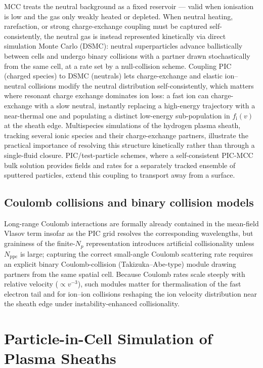 MCC treats the neutral background as a fixed reservoir --- valid when ionisation is low and the gas only weakly heated or depleted. When neutral heating, rarefaction, or strong charge-exchange coupling must be captured self-consistently, the neutral gas is instead represented kinetically via direct simulation Monte Carlo (DSMC): neutral superparticles advance ballistically between cells and undergo binary collisions with a partner drawn stochastically from the same cell, at a rate set by a null-collision scheme. Coupling PIC (charged species) to DSMC (neutrals) lets charge-exchange and elastic ion--neutral collisions modify the neutral distribution self-consistently, which matters where resonant charge exchange dominates ion loss: a fast ion can charge-exchange with a slow neutral, instantly replacing a high-energy trajectory with a near-thermal one and populating a distinct low-energy sub-population in $f_{\mathrm{i}}(v)$ at the sheath edge. Multispecies simulations of the hydrogen plasma sheath, tracking several ionic species and their charge-exchange partners, illustrate the practical importance of resolving this structure kinetically rather than through a single-fluid closure. PIC/test-particle schemes, where a self-consistent PIC-MCC bulk solution provides fields and rates for a separately tracked ensemble of sputtered particles, extend this coupling to transport away from a surface.

\subsection{Coulomb collisions and binary collision models}

Long-range Coulomb interactions are formally already contained in the mean-field Vlasov term insofar as the PIC grid resolves the corresponding wavelengths, but graininess of the finite-$N_{p}$ representation introduces artificial collisionality unless $N_{\mathrm{ppc}}$ is large; capturing the correct small-angle Coulomb scattering rate requires an explicit binary Coulomb-collision (Takizuka--Abe-type) module drawing partners from the same spatial cell. Because Coulomb rates scale steeply with relative velocity ($\propto v^{-3}$), such modules matter for thermalisation of the fast electron tail and for ion--ion collisions reshaping the ion velocity distribution near the sheath edge under instability-enhanced collisionality.

\section{Particle-in-Cell Simulation of Plasma Sheaths}


